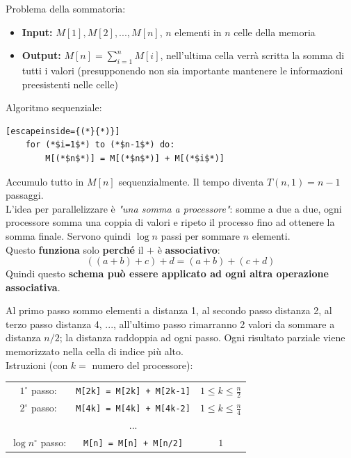 \documentclass[11pt]{article}
\begin{document}
	Problema della sommatoria: 
	\begin{itemize}
		\item \textbf{Input:} $M[1], M[2], ... , M[n]$, $n$ elementi in $n$ celle della memoria
		\item \textbf{Output:} $M[n] = \sum_{i=1}^n M[i]$, nell'ultima cella verrà scritta la somma di tutti i valori (presupponendo non sia importante mantenere le informazioni preesistenti nelle celle)
	\end{itemize}

	Algoritmo sequenziale: 
	\begin{lstlisting}[escapeinside={(*}{*)}]
	for (*$i=1$*) to (*$n-1$*) do:
		M[(*$n$*)] = M[(*$n$*)] + M[(*$i$*)]
	\end{lstlisting}
	Accumulo tutto in $M[n]$ sequenzialmente. Il tempo diventa $T(n,1) = n-1$ passaggi.\\
	
	L'idea per parallelizzare è \textit{"una somma a processore"}: somme a due a due, ogni processore somma una coppia di valori e ripeto il processo fino ad ottenere la somma finale. Servono quindi $\log n$ passi per sommare $n$ elementi.\\
	
	Questo \textbf{funziona }solo \textbf{perché} il $+$ è \textbf{associativo}:
	$$ ((a+b) + c) + d = (a+b) + (c+d)$$
	Quindi questo \textbf{schema può essere applicato ad ogni altra operazione associativa}.\\
	
	\newpage
	
	Al primo passo sommo elementi a distanza 1, al secondo passo distanza 2, al terzo passo distanza 4, ..., all'ultimo passo rimarranno 2 valori da sommare a distanza $n/2$; la distanza raddoppia ad ogni passo. Ogni risultato parziale viene memorizzato nella cella di indice più alto.\\
	
	Istruzioni (con $k=$ numero del processore): 
	\begin{center}
		\begin{tabular}{c c c}
			$1^{\circ}$ passo: & \texttt{M[2k] = M[2k] + M[2k-1]} & $1 \leq k \leq \frac{n}{2}$ \\
			$2^{\circ}$ passo: & \texttt{M[4k] = M[4k] + M[4k-2]} & $1 \leq k \leq \frac{n}{4}$ \\
			& ... & \\
			$\log n^{\circ}$ passo: & \texttt{M[n] = M[n] + M[n/2]} & $1$
		\end{tabular}
	\end{center}
	
\end{document}
